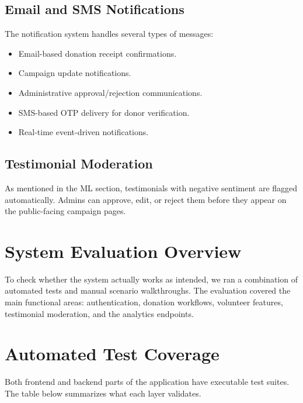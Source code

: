 \documentclass{thesis-library}
\begin{document}
\subsection{Email and SMS Notifications}
The notification system handles several types of messages:
\begin{itemize}
    \item Email-based donation receipt confirmations.
    \item Campaign update notifications.
    \item Administrative approval/rejection communications.
    \item SMS-based OTP delivery for donor verification.
    \item Real-time event-driven notifications.
\end{itemize}

\subsection{Testimonial Moderation}
As mentioned in the ML section, testimonials with negative sentiment are flagged automatically. Admins can approve, edit, or reject them before they appear on the public-facing campaign pages.


\section{System Evaluation Overview}
To check whether the system actually works as intended, we ran a combination of automated tests and manual scenario walkthroughs. The evaluation covered the main functional areas: authentication, donation workflows, volunteer features, testimonial moderation, and the analytics endpoints.

\section{Automated Test Coverage}
Both frontend and backend parts of the application have executable test suites. The table below summarizes what each layer validates.
\end{document}
